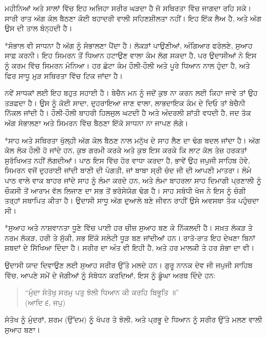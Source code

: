 \documentclass[12pt,a5paper,twoside]{book}  %
\makeatletter
\renewcommand\subsection{\@startsection{subsection}{2}{0pt}{1em}{0.5em}{\punjabifont\large\bfseries}}%
\makeatother
\begin{document}
{ਮਹੀਨਿਆਂ ਅਤੇ ਸਾਲਾਂ ਵਿੱਚ ਇਹ ਅਜਿਹਾ ਸਰੀਰ ਘੜਦਾ ਹੈ ਜੋ ਸਥਿਰਤਾ ਵਿੱਚ ਜਾਗਦਾ ਰਹਿ ਸਕੇ। ਸਾਰੀ ਰਾਤ ਅੱਗ ਕੋਲ ਬੈਠਣਾ ਕੋਈ ਬਹਾਦਰੀ ਵਾਲੀ ਸਹਿਣਸ਼ੀਲਤਾ ਨਹੀਂ। ਇਹ ਇੱਕ ਲੈਅ ਹੈ, ਅਤੇ ਅੱਗ ਉਸ ਦੀ ਤਾਲ ਬੰਨ੍ਹਦੀ ਹੈ।


\subsection*{ਸੰਭਾਲ ਵੀ ਸਾਧਨਾ ਹੈ}
ਅੱਗ ਨੂੰ ਸੰਭਾਲਣਾ ਪੈਂਦਾ ਹੈ। ਲੱਕੜਾਂ ਪਾਉਣੀਆਂ, ਅੰਗਿਆਰ ਫਰੋਲਣੇ, ਸੁਆਹ ਸਾਫ਼ ਕਰਨੀ। ਇਹ ਸਿਮਰਨ ਤੋਂ ਧਿਆਨ ਹਟਾਉਣ ਵਾਲਾ ਕੰਮ ਲੱਗ ਸਕਦਾ ਹੈ, ਪਰ ਉਦਾਸੀਆਂ ਨੇ ਇਸ ਨੂੰ ਕਰਮ ਵਿੱਚ ਸਿਮਰਨ ਮੰਨਿਆ। ਹਰ ਛੋਟਾ ਕੰਮ ਹੌਲੀ-ਹੌਲੀ ਅਤੇ ਪੂਰੇ ਧਿਆਨ ਨਾਲ ਹੁੰਦਾ ਹੈ, ਅਤੇ ਫਿਰ ਸਾਧੂ ਮੁੜ ਸਥਿਰਤਾ ਵਿੱਚ ਟਿਕ ਜਾਂਦਾ ਹੈ।

ਨਵੇਂ ਸਾਧਕਾਂ ਲਈ ਇਹ ਬਹੁਤ ਸਹਾਈ ਹੈ। ਬੇਚੈਨ ਮਨ ਨੂੰ ਜਦੋਂ ਕੁਝ ਨਾ ਕਰਨ ਲਈ ਕਿਹਾ ਜਾਵੇ ਤਾਂ ਉਹ ਤੜਫ਼ਦਾ ਹੈ। ਉਸ ਨੂੰ ਕੋਈ ਸਾਦਾ, ਦੁਹਰਾਇਆ ਜਾਣ ਵਾਲਾ, ਲਾਭਦਾਇਕ ਕੰਮ ਦੇ ਦਿਓ ਤਾਂ ਬੇਚੈਨੀ ਨਿੱਕਲ ਜਾਂਦੀ ਹੈ। ਹੌਲੀ-ਹੌਲੀ ਬਾਹਰੀ ਹਿਲਜੁਲ ਘਟਦੀ ਹੈ ਅਤੇ ਅੰਦਰਲੀ ਸ਼ਾਂਤੀ ਵਧਦੀ ਹੈ, ਜਦ ਤੱਕ ਅੱਗ ਸੰਭਾਲਣਾ ਅਤੇ ਸਿਮਰਨ ਵਿੱਚ ਬੈਠਣਾ ਇੱਕੋ ਸਾਧਨਾ ਨਾ ਜਾਪਣ ਲੱਗੇ।


\subsection*{ਸਾਹ ਅਤੇ ਸਥਿਰਤਾ}
ਖੁੱਲ੍ਹੀ ਅੱਗ ਕੋਲ ਬੈਠਣ ਨਾਲ ਮਨੁੱਖ ਦੇ ਸਾਹ ਲੈਣ ਦਾ ਢੰਗ ਬਦਲ ਜਾਂਦਾ ਹੈ। ਅੱਗ ਕੋਲ ਲੋਕ ਹੌਲੀ ਹੋ ਜਾਂਦੇ ਹਨ, ਕੁਝ ਗਰਮੀ ਕਰਕੇ ਅਤੇ ਕੁਝ ਇਸ ਕਰਕੇ ਕਿ ਲਾਟ ਕੋਲ ਤੇਜ਼ ਹਰਕਤਾਂ ਸੁਰੱਖਿਅਤ ਨਹੀਂ ਲੱਗਦੀਆਂ। ਪਾਠ ਇਸ ਵਿੱਚ ਹੋਰ ਵਾਧਾ ਕਰਦਾ ਹੈ, ਭਾਵੇਂ ਉਹ ਜਪੁਜੀ ਸਾਹਿਬ ਹੋਵੇ, ਸਿਮਰਨ ਵਜੋਂ ਦੁਹਰਾਈ ਜਾਂਦੀ ਬਾਣੀ ਦੀ ਪੰਗਤੀ, ਜਾਂ ਬਾਬਾ ਸ੍ਰੀ ਚੰਦ ਜੀ ਦੀ ਆਪਣੀ ਮਾਤਰਾ। ਲੰਮੇ ਪਾਠ ਵਾਲੇ ਵਾਕ ਬਾਹਰ ਜਾਂਦੇ ਸਾਹ ਨੂੰ ਲੰਮਾ ਕਰਦੇ ਹਨ, ਅਤੇ ਲੰਮਾ ਬਾਹਰਲਾ ਸਾਹ ਦਿਮਾਗੀ ਪ੍ਰਣਾਲੀ ਨੂੰ ਚੌਕਸੀ ਤੋਂ ਆਰਾਮ ਵੱਲ ਲਿਜਾਣ ਦਾ ਸਭ ਤੋਂ ਭਰੋਸੇਯੋਗ ਢੰਗ ਹੈ। ਸਾਹ ਸਬੰਧੀ ਖੋਜ ਨੇ ਇਸ ਨੂੰ ਚੰਗੀ ਤਰ੍ਹਾਂ ਸਥਾਪਿਤ ਕੀਤਾ ਹੈ। ਉਦਾਸੀ ਸਾਧੂ ਅੱਗ ਦੁਆਲੇ ਬਣੇ ਜੀਵਨ ਰਾਹੀਂ ਉਸੇ ਅਵਸਥਾ ਤੱਕ ਪਹੁੰਚਦਾ ਸੀ।


\subsection*{ਸੁਆਹ ਅਤੇ ਨਾਸ਼ਵਾਨਤਾ}
ਧੂਣੇ ਵਿੱਚ ਪਾਈ ਹਰ ਚੀਜ਼ ਸੁਆਹ ਬਣ ਕੇ ਨਿੱਕਲਦੀ ਹੈ। ਸਖ਼ਤ ਲੱਕੜ ਤੇ ਨਰਮ ਲੱਕੜ, ਹਰੀ ਤੇ ਸੁੱਕੀ, ਸਭ ਇੱਕੋ ਸਲੇਟੀ ਧੂੜ ਬਣ ਜਾਂਦੀਆਂ ਹਨ। ਰਾਤੋ-ਰਾਤ ਇਹ ਦੇਖਣਾ ਬਿਨਾਂ ਸ਼ਬਦਾਂ ਦੇ ਸਿੱਖਿਆ ਦਿੰਦਾ ਹੈ। ਸਰੀਰ ਦਾ ਅੰਤ ਵੀ ਇਹੀ ਹੈ, ਅਤੇ ਹਰ ਮਾਲਕੀ ਤੇ ਹਰ ਸ਼ੋਭਾ ਦਾ ਵੀ।

ਉਦਾਸੀ ਯਾਦ ਦਿਵਾਉਣ ਲਈ ਸੁਆਹ ਸਰੀਰ ਉੱਤੇ ਮਲਦੇ ਹਨ। ਗੁਰੂ ਨਾਨਕ ਦੇਵ ਜੀ ਜਪੁਜੀ ਸਾਹਿਬ ਵਿੱਚ, ਆਪਣੇ ਸਮੇਂ ਦੇ ਜੋਗੀਆਂ ਨੂੰ ਸੰਬੋਧਨ ਕਰਦਿਆਂ, ਇਸ ਨੂੰ ਡੂੰਘਾ ਅਰਥ ਦਿੰਦੇ ਹਨ:

\begin{quote}
“ਮੁੰਦਾ ਸੰਤੋਖੁ ਸਰਮੁ ਪਤੁ ਝੋਲੀ ਧਿਆਨ ਕੀ ਕਰਹਿ ਬਿਭੂਤਿ ॥” \\
(ਆਦਿ ੬, ਜਪੁ)
\end{quote}
ਸੰਤੋਖ ਨੂੰ ਮੁੰਦਰਾਂ, ਸ਼ਰਮ (ਉੱਦਮ) ਨੂੰ ਖੱਪਰ ਤੇ ਝੋਲੀ, ਅਤੇ ਪ੍ਰਭੂ ਦੇ ਧਿਆਨ ਨੂੰ ਸਰੀਰ ਉੱਤੇ ਮਲਣ ਵਾਲੀ ਸੁਆਹ ਬਣਾ।

}
\end{document}
